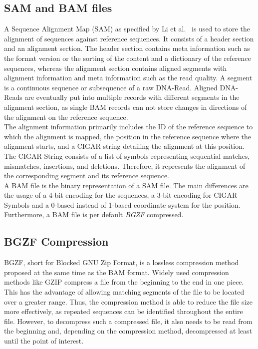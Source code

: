 \subsection{SAM and BAM files}
A Sequence Alignment Map (SAM) as specified by Li et al.~\cite{samformat} is used to store the alignment of sequences against reference sequences. It consists of a header section and an alignment section. The header section contains meta information such as the format version or the sorting of the content and a dictionary of the reference sequences, whereas the alignment section contains aligned segments with alignment information and meta information such as the read quality. A segment is a continuous sequence or subsequence of a raw DNA-Read. Aligned DNA-Reads are eventually put into multiple records with different segments in the alignment section, as single BAM records can not store changes in directions of the alignment on the reference sequence.\\

The alignment information primarily includes the ID of the reference sequence to which the alignment is mapped, the position in the reference sequence where the alignment starts, and a CIGAR string detailing the alignment at this position. The CIGAR String consists of a list of symbols representing sequential matches, mismatches, insertions, and deletions. Therefore, it represents the alignment of the corresponding segment and its reference sequence. \\

A BAM file is the binary representation of a SAM file. The main differences are the usage of a 4-bit encoding for the sequences, a 3-bit encoding for CIGAR Symbols and a 0-based instead of 1-based coordinate system for the position. Furthermore, a BAM file is per default \textit{BGZF} compressed.

\subsection{BGZF Compression} \label{bgzf}
BGZF, short for Blocked GNU Zip Format, is a lossless compression method proposed at the same time as the BAM format. Widely used compression methods like GZIP compress a file from the beginning to the end in one piece. This has the advantage of allowing matching segments of the file to be located over a greater range. Thus, the compression method is able to reduce the file size more effectively, as repeated sequences can be identified throughout the entire file. However, to decompress such a compressed file, it also needs to be read from the beginning and, depending on the compression method, decompressed at least until the point of interest. \\


